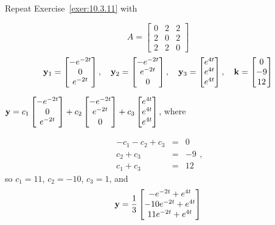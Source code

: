 \documentclass{ximera}
\begin{document}
\begin{problem}\label{exer:10.3.12}
 Repeat Exercise~\ref{exer:10.3.11} with

$$ A=\begin{bmatrix} 0 & 2 & 2\\ 2 & 0 & 2\\ 2 & 2 & 0\end{bmatrix}$$
$${\bf y}_1=\begin{bmatrix}-e^{-2t} \\ 0 \\ e^{-2t}
\end{bmatrix}, \quad
{\bf y}_2=\begin{bmatrix}-e^{-2t} \\ e^{-2t} \\
0\end{bmatrix}, \quad
{\bf y}_3=\begin{bmatrix} e^{4t} \\ e^{4t} \\ e^{4t}\end{bmatrix}, \quad
{\bf k}=\begin{bmatrix} 0 \\-9 \\ 12\end{bmatrix}$$

\begin{solution}
    ${\bf y}=c_1\begin{bmatrix}-e^{-2t} \\ 0 \\ e^{-2t}
\end{bmatrix}+c_2
\begin{bmatrix}-e^{-2t} \\ e^{-2t} \\
0\end{bmatrix}+
c_3\begin{bmatrix} e^{4t} \\ e^{4t} \\ e^{4t}\end{bmatrix}$,
where

$$\begin{array}{rcr}
-c_1-c_2+c_3&=&0\\c_2+c_3&=&-9\\c_1+c_3&=&12
\end{array},
$$
 so $c_1=11$, $c_2=-10$, $c_3=1$, and
$${\bf y
}=\frac{1}{3}\begin{bmatrix}-e^{-2t}+e^{4t}\\-10e^{-2t}+e^{4t}\\
11e^{-2t}+e^{4t}\end{bmatrix}$$



\end{solution}
\end{problem}
\end{document}
